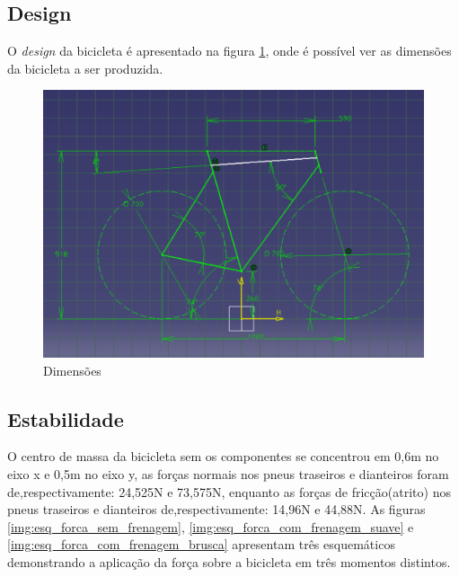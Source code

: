 	\subsection{Design}

	O \textit{design} da bicicleta é apresentado na figura \ref{img:dimensoes}, onde é possível ver as dimensões da bicicleta a ser produzida.	
	
	\graphicspath{{figuras/}}
	\begin{figure}[h!]
	\centering
	\includegraphics[scale=0.80]{dimensoes.png}
	\caption{Dimensões}
	\label{img:dimensoes}
	\end{figure}


	\subsection{Estabilidade}
	O centro de massa da bicicleta sem os componentes se concentrou em 0,6m no eixo x e 0,5m no eixo y, as forças normais nos pneus traseiros e dianteiros foram de,respectivamente: 24,525N e 73,575N, enquanto as forças de fricção(atrito)  nos pneus traseiros e dianteiros de,respectivamente: 14,96N e 44,88N. As figuras \ref{img:esq_forca_sem_frenagem}, \ref{img:esq_forca_com_frenagem_suave} e \ref{img:esq_forca_com_frenagem_brusca} apresentam três esquemáticos demonstrando a aplicação da força sobre a bicicleta em três momentos distintos. 

